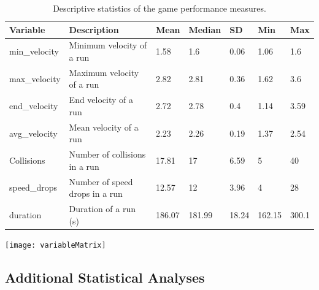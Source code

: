 \documentclass[fleqn,10pt]{wlscirep}
\begin{document}
\begin{table}[!h]
\centering
\caption{\label{tab:GameVariables}Descriptive statistics of the game performance measures.}
\begin{tabular}{lllllll}
\hline
Variable & Description & Mean & Median & SD & Min & Max \\
\hline
min\_velocity & Minimum velocity of a run & 1.58 & 1.6 & 0.06 & 1.06 & 1.6 \\
max\_velocity & Maximum velocity of a run & 2.82 & 2.81 & 0.36 & 1.62 & 3.6 \\
end\_velocity & End velocity of a run & 2.72 & 2.78 & 0.4 & 1.14 & 3.59 \\
avg\_velocity & Mean velocity of a run & 2.23 & 2.26 & 0.19 & 1.37 & 2.54 \\
Collisions & Number of collisions in a run & 17.81 & 17 & 6.59 & 5 & 40 \\
speed\_drops & Number of speed drops in a run & 12.57 & 12 & 3.96 & 4 & 28 \\
duration & Duration of a run (s) & 186.07 & 181.99 & 18.24 & 162.15 & 300.1 \\
\hline
\end{tabular}
\end{table}


\begin{minipage}{\textwidth}
\centering
\texttt{[image: variableMatrix]}
\label{fig:scatter_matrix}
\end{minipage}

\subsection*{Additional Statistical Analyses}


\end{document}
